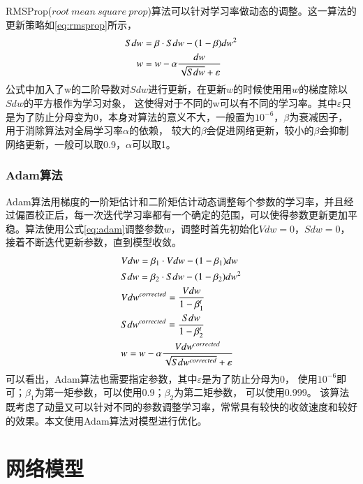RMSProp($root~mean~square~prop$)算法\cite{hinton2012neural}可以针对学习率做动态的调整。这一算法的更新策略如\eqref{eq:rmsprop}所示，
\begin{equation}
\begin{aligned}
\centering
Sdw & =\beta \cdot Sdw-(1-\beta )dw^2 \\
w & =w- \alpha \frac{dw}{\sqrt{Sdw}+\varepsilon }
\end{aligned}
\label{eq:rmsprop}
\end{equation}
公式中加入了w的二阶导数对$Sdw$进行更新，在更新$w$的时候使用用$w$的梯度除以$Sdw$的平方根作为学习对象，
这使得对于不同的w可以有不同的学习率。其中$\varepsilon$只是为了防止分母变为0，本身对算法的意义不大，一般置为${10}^{-6}$，$\beta$为衰减因子，用于消除算法对全局学习率$\alpha$的依赖，
较大的$\beta$会促进网络更新，较小的$\beta$会抑制网络更新，一般可以取0.9，$\alpha$可以取1。

\subsubsection{Adam算法}

Adam\cite{kingma2014adam}算法用梯度的一阶矩估计和二阶矩估计动态调整每个参数的学习率，并且经过偏置校正后，每一次迭代学习率都有一个确定的范围，可以使得参数更新更加平稳。算法使用公式\eqref{eq:adam}调整参数$w$，调整时首先初始化$Vdw=0$，$Sdw=0$，
接着不断迭代更新参数，直到模型收敛。
\begin{equation}
\begin{aligned}
\centering
&Vdw  =\beta_1 \cdot Vdw-(1-\beta_1 )dw \\
&Sdw  =\beta_2 \cdot Sdw-(1-\beta_2 )dw^2 \\
&Vdw^{corrected}  =\frac{Vdw}{1-\beta_1^t}\\
&Sdw^{corrected}  =\frac{Sdw}{1-\beta_2^t}\\
&w  =w- \alpha \frac{Vdw^{corrected}}{\sqrt{Sdw^{corrected}}+\varepsilon }
\end{aligned}
\label{eq:adam}
\end{equation}
可以看出，Adam算法也需要指定参数，其中$\varepsilon$是为了防止分母为0，
使用${10}^{-6}$即可；$\beta_1$为第一矩参数，可以使用0.9；$\beta_2$为第二矩参数，
可以使用0.999。
该算法既考虑了动量又可以针对不同的参数调整学习率，常常具有较快的收敛速度和较好的效果。本文使用Adam算法对模型进行优化。

\section{网络模型}

